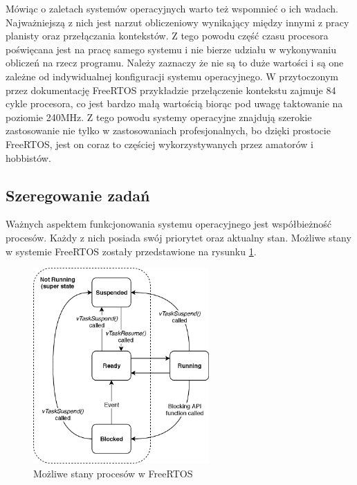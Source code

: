             \vspace{1em}
            
            Mówiąc o zaletach systemów operacyjnych warto też wspomnieć o ich wadach. Najważniejszą z nich jest narzut obliczeniowy wynikający między innymi z pracy planisty oraz przełączania kontekstów. Z tego powodu część czasu procesora poświęcana jest na pracę samego systemu i nie bierze udziału w wykonywaniu obliczeń na rzecz programu. Należy zaznaczy że nie są to duże wartości i są one zależne od indywidualnej konfiguracji systemu operacyjnego. W przytoczonym przez dokumentację FreeRTOS przykładzie \cite{context} przełączenie kontekstu zajmuje 84 cykle procesora, co jest bardzo małą wartością biorąc pod uwagę taktowanie na poziomie 240MHz. Z tego powodu systemy operacyjne znajdują szerokie zastosowanie nie tylko w zastosowaniach profesjonalnych, bo dzięki prostocie FreeRTOS, jest on coraz to częściej wykorzystywanych przez amatorów i hobbistów.
            
        \subsection{Szeregowanie zadań}
            Ważnych aspektem funkcjonowania systemu operacyjnego jest współbieżność procesów. Każdy z nich posiada swój priorytet oraz aktualny stan. Możliwe stany w systemie FreeRTOS zostały przedstawione na rysunku \ref{fig:freertos_tasks_state}.
      
            \begin{figure}[ht]
              \centering
              \includegraphics[width=0.6\textwidth]{img/FreeRTOS-tasks-state.png}
              \caption{Możliwe stany procesów w FreeRTOS \cite{freertos_task_fig}}
              \label{fig:freertos_tasks_state}
            \end{figure}
            
